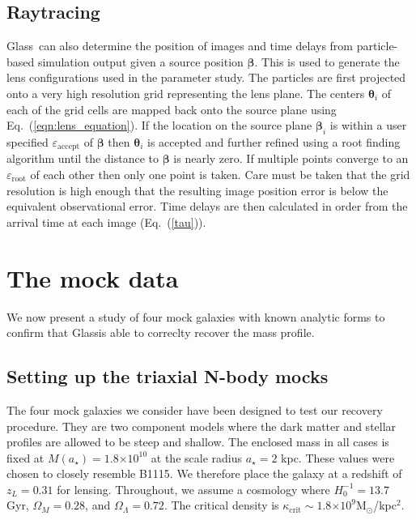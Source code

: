 \documentclass[galley]{mn2e}
\newcommand{\Glass}{{\sc Glass}}
\newcommand{\eps}{\ensuremath{\varepsilon}}
\newcommand{\Msun}{\ensuremath{\mathrm{M}_\odot}}
\newcommand{\eqnref}[1] {Eq.~(\ref{#1})}
\newcommand{\e}[1]{\ensuremath{\times 10^{#1}}}
\renewcommand{\vec}[1]{\ensuremath{\boldsymbol{#1}}}
\begin{document}
\subsection{Raytracing}
\label{Raytracing}
\Glass\ can also determine the position of images and time delays from 
particle-based simulation output given a source position $\vec\beta$. This is
used to generate the lens configurations used in the parameter study.  The
particles are first projected onto a very high resolution grid representing the
lens plane. The centers $\vec\theta_i$ of each of the grid cells are mapped
back onto the source plane using \eqnref{eqn:lens_equation}. If the location on
the source plane $\vec\beta_i$ is within a user specified
$\eps_\mathrm{accept}$ of $\vec\beta$ then $\vec\theta_i$ is 
accepted and further refined using a root finding algorithm until the distance
to $\vec\beta$ is nearly zero. If multiple points converge to an
$\eps_\mathrm{root}$ of each other then only one point is taken.  Care must be
taken that the grid resolution is high enough that the resulting image position
error is below the equivalent observational error. Time delays are then
calculated in order from the arrival time at each image (\eqnref{tau}).

\section{The mock data}\label{sec:mockdata}

We now present a study of four mock galaxies with known analytic forms to
confirm that \Glass is able to correclty recover the mass profile.

\subsection{Setting up the triaxial N-body mocks}

The four mock galaxies we consider have been designed to test our recovery
procedure. They are two component models where the dark matter and stellar
profiles are allowed to be steep and shallow.  The enclosed mass in all cases
is fixed at $M(a_\star)= 1.8\e{10}$ at the scale radius $a_\star=2$ kpc. These
values were chosen to closely resemble B1115. We therefore place the galaxy at
a redshift of $z_L = 0.31$ for lensing.  Throughout, we assume a cosmology
where $H_0^{-1}=13.7$ Gyr, $\Omega_M=0.28$, and $\Omega_\Lambda=0.72$. The
critical density is $\kappa_\mathrm{crit}\sim 1.8\e{9}$\Msun/kpc$^2$.
\end{document}
